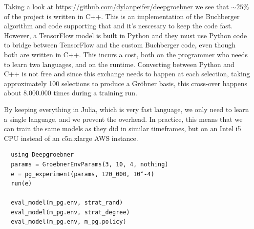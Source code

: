\documentclass{article}
\theoremstyle{changedot}
\theoremstyle{changedotbreak}
\theoremstyle{nonumberplain}
\begin{document}
Taking a look at \url{https://github.com/dylanpeifer/deepgroebner} we see that $\sim 25\%$ of the project is written in C++. This is an implementation of the Buchberger algorithm and code supporting that and it's nescesary to keep the code fast. However, a TensorFlow model is built in Python and they must use Python code to bridge between TensorFlow and the custom Buchberger code, even though both are written in C++. This incurs a cost, both on the programmer who needs to learn two languages, and on the runtime. Converting between Python and C++ is not free and since this exchange needs to happen at each selection, taking approximately 100 selections to produce a Gröbner basis, this cross-over happens about 8.000.000 times during a training run.

By keeping everything in Julia, which is very fast language, we only need to learn a single language, and we prevent the overhead. In practice, this means that we can train the same models as they did in similar timeframes, but on an Intel i5 CPU instead of an c5n.xlarge AWS instance.

\begin{verbatim}
  using Deepgroebner
  params = GroebnerEnvParams(3, 10, 4, nothing)
  e = pg_experiment(params, 120_000, 10^-4)
  run(e)

  eval_model(m_pg.env, strat_rand)
  eval_model(m_pg.env, strat_degree)
  eval_model(m_pg.env, m_pg.policy)
\end{verbatim}








\printbibliography
\end{document}
